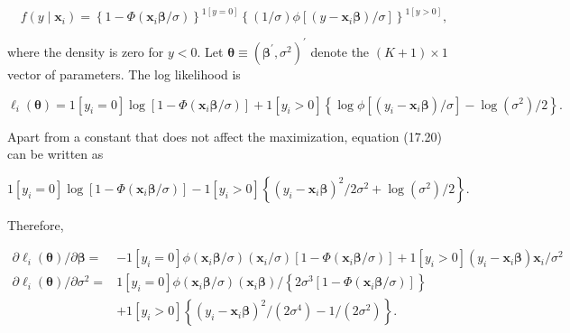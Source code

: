 \documentclass[10pt]{article}
\begin{document}
\begin{equation*}
f\left(y \mid \mathbf{x}_{i}\right)=\left\{1-\Phi\left(\mathbf{x}_{i} \boldsymbol{\beta} / \sigma\right)\right\}^{1[y=0]}\left\{(1 / \sigma) \phi\left[\left(y-\mathbf{x}_{i} \boldsymbol{\beta}\right) / \sigma\right]\right\}^{1[y>0]}, \tag{17.19}
\end{equation*}


where the density is zero for $y<0$. Let $\boldsymbol{\theta} \equiv\left(\boldsymbol{\beta}^{\prime}, \sigma^{2}\right)^{\prime}$ denote the $(K+1) \times 1$ vector of parameters. The log likelihood is


\begin{equation*}
\ell_{i}(\boldsymbol{\theta})=1\left[y_{i}=0\right] \log \left[1-\Phi\left(\mathbf{x}_{i} \boldsymbol{\beta} / \sigma\right)\right]+1\left[y_{i}>0\right]\left\{\log \phi\left[\left(y_{i}-\mathbf{x}_{i} \boldsymbol{\beta}\right) / \sigma\right]-\log \left(\sigma^{2}\right) / 2\right\} . \tag{17.20}
\end{equation*}


Apart from a constant that does not affect the maximization, equation (17.20) can be written as

$$
1\left[y_{i}=0\right] \log \left[1-\Phi\left(\mathbf{x}_{i} \boldsymbol{\beta} / \sigma\right)\right]-1\left[y_{i}>0\right]\left\{\left(y_{i}-\mathbf{x}_{i} \boldsymbol{\beta}\right)^{2} / 2 \sigma^{2}+\log \left(\sigma^{2}\right) / 2\right\} .
$$

Therefore,


\begin{align*}
\partial \ell_{i}(\boldsymbol{\theta}) / \partial \boldsymbol{\beta}= & -1\left[y_{i}=0\right] \phi\left(\mathbf{x}_{i} \boldsymbol{\beta} / \sigma\right)\left(\mathbf{x}_{i} / \sigma\right)\left[1-\Phi\left(\mathbf{x}_{i} \boldsymbol{\beta} / \sigma\right)\right]+1\left[y_{i}>0\right]\left(y_{i}-\mathbf{x}_{i} \boldsymbol{\beta}\right) \mathbf{x}_{i} / \sigma^{2}  \tag{17.21}\\
\partial \ell_{i}(\boldsymbol{\theta}) / \partial \sigma^{2}= & 1\left[y_{i}=0\right] \phi\left(\mathbf{x}_{i} \boldsymbol{\beta} / \sigma\right)\left(\mathbf{x}_{i} \boldsymbol{\beta}\right) /\left\{2 \sigma^{3}\left[1-\Phi\left(\mathbf{x}_{i} \boldsymbol{\beta} / \sigma\right)\right]\right\} \\
& +1\left[y_{i}>0\right]\left\{\left(y_{i}-\mathbf{x}_{i} \boldsymbol{\beta}\right)^{2} /\left(2 \sigma^{4}\right)-1 /\left(2 \sigma^{2}\right)\right\} . \tag{17.22}
\end{align*}
\end{document}
